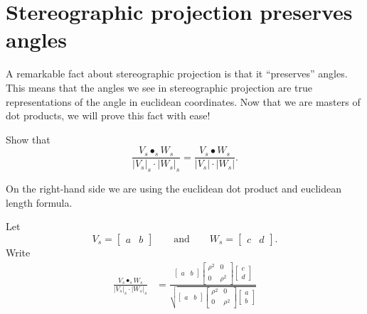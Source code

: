 \documentclass{ximera}
\begin{document}
\section{Stereographic projection preserves angles}


A remarkable fact about stereographic projection is that it
``preserves'' angles. This means that the angles we see in
stereographic projection are true representations of the angle in
euclidean coordinates.  Now that we are masters of dot products, we
will prove this fact with ease!

\begin{problem}
  Show that
  \[
  \frac{V_s\bullet_s W_s}{|V_s|_s\cdot|W_s|_s} = \frac{V_s\bullet W_s}{|V_s|\cdot|W_s|}.
  \]
  \begin{hint}
    On the right-hand side we are using the euclidean dot product and
    euclidean length formula.
  \end{hint}
    \begin{freeResponse}
    Let
      \[
      V_s=
      \begin{bmatrix}
        a & b
      \end{bmatrix}
      \qquad\text{and}\qquad
      W_s=
      \begin{bmatrix}
        c & d
      \end{bmatrix}.
      \]
      Write
      \begin{align*}
        \frac{V_s\bullet_s W_s}{|V_s|_s\cdot|W_s|_s} &= \frac{
          \begin{bmatrix}
            a & b
          \end{bmatrix}
          \begin{bmatrix}
            \rho^2 & 0 \\
            0 & \rho^2
          \end{bmatrix}
          \begin{bmatrix}
            c\\
            d
          \end{bmatrix}
        }{
          \sqrt{\begin{bmatrix}
            a & b
          \end{bmatrix}
          \begin{bmatrix}
            \rho^2 & 0 \\
            0 & \rho^2
          \end{bmatrix}
          \begin{bmatrix}
            a\\
            b
          \end{bmatrix}}
}
\end{align*}
\end{freeResponse}
\end{problem}
\end{document}
